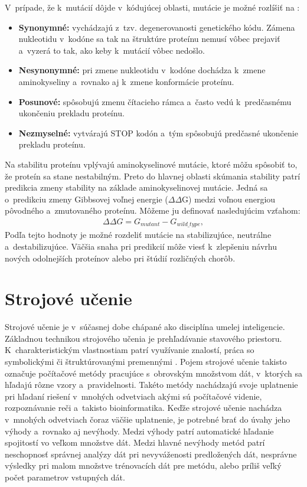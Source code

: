 V~prípade, že k~mutácií dôjde v~kódujúcej oblasti, mutácie je možné rozlíšiť na \cite{flegr}:
\begin{itemize}
	\item \textbf{Synonymné:} vychádzajú z~tzv. degenerovanosti genetického kódu. Zámena nukleotidu v~kodóne sa tak na štruktúre proteínu nemusí vôbec prejaviť a~vyzerá to tak, ako keby k~mutácií vôbec nedošlo. 
	\item \textbf{Nesynonymné:} pri zmene nukleotidu v~kodóne dochádza k~zmene aminokyseliny a~rovnako aj k~zmene konformácie proteínu.
	\item \textbf{Posunové:} spôsobujú zmenu čítacieho rámca a~často vedú k~predčasnému ukončeniu prekladu proteínu.
	\item \textbf{Nezmyselné:} vytvárajú STOP kodón a~tým spôsobujú predčasné ukončenie prekladu proteínu.
\end{itemize}
\newpage
Na stabilitu proteínu vplývajú aminokyselinové mutácie, ktoré môžu spôsobiť to, že proteín sa stane nestabilným. Preto do hlavnej oblasti skúmania stability patrí predikcia zmeny stability na základe aminokyselinovej mutácie. Jedná sa o~predikciu zmeny Gibbsovej voľnej energie ($\Delta\Delta$G) medzi voľnou energiou pôvodného a~zmutovaného proteínu. Môžeme ju definovať nasledujúcim vzťahom:
\begin{align}
	\Delta\Delta G = G_{mutant} - G_{wild\_type},
\end{align}
Podľa tejto hodnoty je možné rozdeliť mutácie na stabilizujúce, neutrálne a~destabilizujúce. Väčšia snaha pri predikcií môže viesť k~zlepšeniu návrhu nových odolnejších proteínov alebo pri štúdií rozličných chorôb.


\chapter{Strojové učenie}
\label{ml}
Strojové učenie je v~súčasnej dobe chápané ako disciplína umelej inteligencie. Základnou technikou strojového učenia je prehľadávanie stavového priestoru. K~charakteristickým vlastnostiam patrí využívanie znalostí, práca so symbolickými či štruktúrovanými premennými \cite{machine_learning}. Pojem strojové učenie takisto označuje počítačové metódy pracujúce s~obrovským množstvom dát, v~ktorých sa hľadajú rôzne vzory a~pravidelnosti. Takéto metódy nachádzajú svoje uplatnenie pri hľadaní riešení v~mnohých odvetviach akými sú počítačové videnie, rozpoznávanie reči a~takisto bioinformatika. Keďže strojové učenie nachádza v~mnohých odvetviach čoraz väčšie uplatnenie, je potrebné brať do úvahy jeho výhody a~rovnako aj nevýhody. Medzi výhody patrí automatické hľadanie spojitostí vo veľkom množstve dát. Medzi hlavné nevýhody metód patrí neschopnosť správnej analýzy dát pri nevyváženosti predložených dát, nesprávne výsledky pri malom množstve trénovacích dát pre metódu, alebo príliš veľký počet parametrov vstupných dát.

